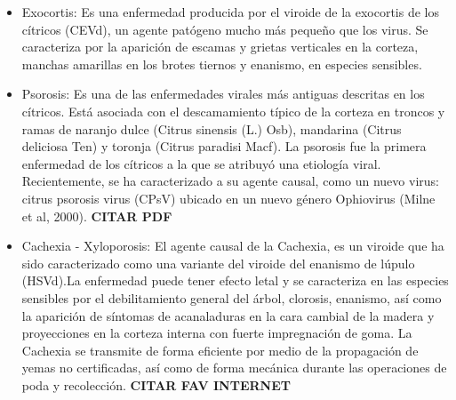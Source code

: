 \begin{itemize}
\item Exocortis: Es una enfermedad producida por el viroide de la exocortis de los c\'{i}tricos (CEVd), un agente pat\'{o}geno mucho m\'{a}s peque\~{n}o que los virus. Se caracteriza por la aparici\'{o}n de escamas y grietas verticales en la corteza, manchas amarillas en los brotes tiernos y enanismo, en especies sensibles.\cite{EXO}
\item Psorosis: Es una de las enfermedades virales m\'{a}s antiguas descritas en los c\'{i}tricos. Est\'{a} asociada con el descamamiento t\'{i}pico de la corteza en troncos y ramas de naranjo dulce (Citrus sinensis (L.) Osb), mandarina (Citrus deliciosa Ten) y toronja (Citrus paradisi Macf). La psorosis fue la primera enfermedad de los c\'{i}tricos a la que se atribuy\'{o} una etiolog\'{i}a viral. Recientemente, se ha caracterizado a su agente causal, como un nuevo virus: citrus psorosis virus (CPsV) ubicado en un nuevo g\'{e}nero Ophiovirus (Milne et al, 2000). \textbf{CITAR PDF}
\item Cachexia - Xyloporosis: El agente causal de la Cachexia, es un viroide que ha sido caracterizado como una variante del viroide del enanismo de l\'{u}pulo (HSVd).La enfermedad puede tener efecto letal y se caracteriza en las especies sensibles por el debilitamiento general del \'{a}rbol, clorosis, enanismo, as\'{i} como la aparici\'{o}n de s\'{i}ntomas de acanaladuras en la cara cambial de la madera y proyecciones en la corteza interna con fuerte impregnaci\'{o}n de goma. La Cachexia se transmite de forma eficiente por medio de la propagaci\'{o}n de yemas no certificadas, as\'{i} como de forma mec\'{a}nica durante las operaciones de poda y recolecci\'{o}n. \textbf{CITAR FAV INTERNET}
\end{itemize}

